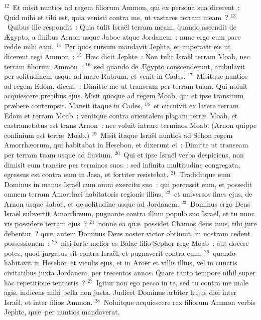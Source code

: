 ${}^{12}$~Et misit nuntios ad regem filiorum Ammon, qui ex persona sua dicerent~: Quid mihi et tibi est, quia venisti contra me, ut vastares terram meam~?
${}^{13}$~Quibus ille respondit~: Quia tulit Isra\"el terram meam, quando ascendit de \AE gypto, a finibus Arnon usque Jaboc atque Jordanem~: nunc ergo cum pace redde mihi eam.
${}^{14}$~Per quos rursum mandavit Jephte, et imperavit eis ut dicerent regi Ammon~:
${}^{15}$~H\ae c dicit Jephte~: Non tulit Isra\"el terram Moab, nec terram filiorum Ammon~:
${}^{16}$~sed quando de \AE gypto conscenderunt, ambulavit per solitudinem usque ad mare Rubrum, et venit in Cades.
${}^{17}$~Misitque nuntios ad regem Edom, dicens~: Dimitte me ut transeam per terram tuam. Qui noluit acquiescere precibus ejus. Misit quoque ad regem Moab, qui et ipse transitum pr\ae bere contempsit. Mansit itaque in Cades,
${}^{18}$~et circuivit ex latere terram Edom et terram Moab~: venitque contra orientalem plagam terr\ae\ Moab, et castrametatus est trans Arnon~: nec voluit intrare terminos Moab. (Arnon quippe confinium est terr\ae\ Moab.)
${}^{19}$~Misit itaque Isra\"el nuntios ad Sehon regem Amorrh\ae orum, qui habitabat in Hesebon, et dixerunt ei~: Dimitte ut transeam per terram tuam usque ad fluvium.
${}^{20}$~Qui et ipse Isra\"el verba despiciens, non dimisit eum transire per terminos suos~: sed infinita multitudine congregata, egressus est contra eum in Jasa, et fortiter resistebat.
${}^{21}$~Tradiditque eum Dominus in manus Isra\"el cum omni exercitu suo~: qui percussit eum, et possedit omnem terram Amorrh\ae i habitatoris regionis illius,
${}^{22}$~et universos fines ejus, de Arnon usque Jaboc, et de solitudine usque ad Jordanem.
${}^{23}$~Dominus ergo Deus Isra\"el subvertit Amorrh\ae um, pugnante contra illum populo suo Isra\"el, et tu nunc vis possidere terram ejus~?
${}^{24}$~nonne ea qu\ae\ possidet Chamos deus tuus, tibi jure debentur~? qu\ae\ autem Dominus Deus noster victor obtinuit, in nostram cedent possessionem~:
${}^{25}$~nisi forte melior es Balac filio Sephor rege Moab~; aut docere potes, quod jurgatus sit contra Isra\"el, et pugnaverit contra eum,
${}^{26}$~quando habitavit in Hesebon et viculis ejus, et in Aro\"er et villis illius, vel in cunctis civitatibus juxta Jordanem, per trecentos annos. Quare tanto tempore nihil super hac repetitione tentastis~?
${}^{27}$~Igitur non ego pecco in te, sed tu contra me male agis, indicens mihi bella non justa. Judicet Dominus arbiter hujus diei inter Isra\"el, et inter filios Ammon.
${}^{28}$~Noluitque acquiescere rex filiorum Ammon verbis Jephte, qu\ae\ per nuntios mandaverat.


